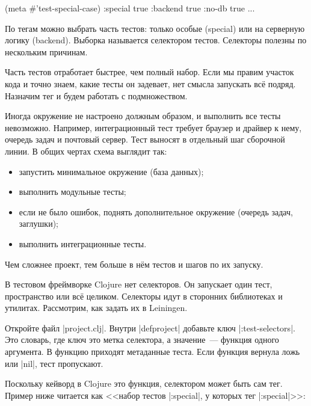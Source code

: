 \begin{english}
  \begin{clojure}
(meta #'test-special-case)
{:special true :backend true :no-db true ...}
  \end{clojure}
\end{english}

По тегам можно выбрать часть тестов: только особые (special) или на серверную
логику (backend). Выборка называется селектором тестов. Селекторы полезны по
нескольким причинам.

Часть тестов отработает быстрее, чем полный набор. Если мы правим участок кода
и точно знаем, какие тесты он задевает, нет смысла запускать вс\"{е}
подряд. Назначим тег и будем работать с подмножеством.

Иногда окружение не настроено должным образом, и выполнить все тесты
невозможно. Например, интеграционный тест требует браузер и драйвер к нему,
очередь задач и почтовый сервер. Тест выносят в отдельный шаг сборочной линии. В
общих чертах схема выглядит так:

\begin{itemize}

\item
  запустить минимальное окружение (база данных);

\item
  выполнить модульные тесты;

\item
  если не было ошибок, поднять дополнительное окружение (очередь задач,
  заглушки);

\item
  выполнить интеграционные тесты.

\end{itemize}

\noindent
Чем сложнее проект, тем больше в н\"{е}м тестов и шагов по их запуску.

В тестовом фреймворке Clojure нет селекторов. Он запускает один тест,
пространство или вс\"{е} целиком. Селекторы идут в сторонних библиотеках и
утилитах. Рассмотрим, как задать их в Leiningen.

Откройте файл \spverb|project.clj|. Внутри \spverb|defproject| добавьте ключ
\spverb|:test-selectors|. Это словарь, где ключ это метка селектора, а
значение~--- функция одного аргумента. В функцию приходят метаданные теста. Если
функция вернула ложь или \spverb|nil|, тест пропускают.

Поскольку кейворд в Clojure это функция, селектором может быть сам тег. Пример
ниже читается как <<набор тестов \spverb|:special|, у которых тег \spverb|:special|>>:

